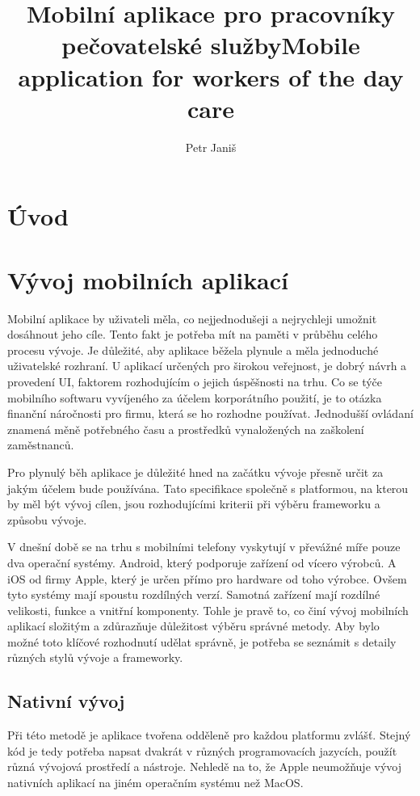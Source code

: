 \documentclass[
  biblatex,
  glossaries,
  index
]{kidiplom}
\title{Mobilní aplikace pro pracovníky pečovatelské služby}
\title[english]{Mobile application for workers of the day care}
\author{Petr Janiš}
\begin{document}
\maketitle

\section{Úvod}

\newpage

\section{Vývoj mobilních aplikací}
Mobilní aplikace by uživateli měla, co nejjednodušeji a nejrychleji umožnit dosáhnout jeho cíle. Tento fakt je potřeba mít na paměti v průběhu celého procesu vývoje. Je důležité, aby aplikace běžela plynule a měla jednoduché uživatelské rozhraní. U aplikací určených pro širokou veřejnost, je dobrý návrh a provedení UI, faktorem rozhodujícím o jejich úspěšnosti na trhu. Co se týče mobilního softwaru vyvíjeného za účelem korporátního použití, je to otázka finanční náročnosti pro firmu, která se ho rozhodne používat. Jednodušší ovládaní znamená měně potřebného času a prostředků vynaložených na zaškolení zaměstnanců.

Pro plynulý běh aplikace je důležité hned na začátku vývoje přesně určit
 za jakým účelem bude používána. Tato specifikace společně s platformou, 
 na kterou by měl být vývoj cílen, jsou rozhodujícími kriterii při výběru frameworku a způsobu vývoje.

V dnešní době se na trhu s mobilními telefony vyskytují v převážné míře pouze dva operační systémy. Android, který podporuje zařízení od vícero výrobců. A iOS od firmy Apple, který je určen přímo pro hardware od toho výrobce. Ovšem tyto systémy mají spoustu rozdílných verzí. Samotná zařízení mají rozdílné velikosti, funkce a vnitřní komponenty. Tohle je pravě to, co činí vývoj mobilních aplikací složitým a zdůrazňuje důležitost výběru správné metody. Aby bylo možné toto klíčové rozhodnutí udělat správně, je potřeba se seznámit s detaily různých stylů vývoje a frameworky.

\subsection{Nativní vývoj}
Při této metodě je aplikace tvořena odděleně pro každou platformu zvlášť. Stejný kód je tedy potřeba napsat dvakrát v různých programovacích jazycích, použít různá vývojová prostředí a nástroje. Nehledě na to, že Apple neumožňuje vývoj nativních aplikací na jiném operačním systému než MacOS. 
\end{document}
